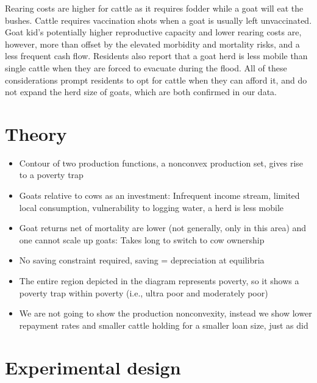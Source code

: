 	Rearing costs are higher for cattle as it requires fodder while a goat will eat the bushes. Cattle requires vaccination shots when a goat is usually left unvaccinated. Goat kid's potentially higher reproductive capacity and lower rearing costs are, however, more than offset by the elevated morbidity and mortality risks, and a less frequent cash flow. Residents also report that a goat herd is less mobile than single cattle when they are forced to evacuate during the flood. All of these considerations prompt residents to opt for cattle when they can afford it, and do not expand the herd size of goats, which are both confirmed in our data.


\section{Theory}
\label{SecTheory}

\hspace{-3em}\mpage{\linewidth}{}

\begin{itemize}
\vspace{1.0ex}\setlength{\itemsep}{1.0ex}\setlength{\baselineskip}{12pt}
\item	Contour of two production functions, a nonconvex production set, gives rise to a poverty trap
\item	Goats relative to cows as an investment: Infrequent income stream, limited local consumption, vulnerability to logging water, a herd is less mobile
\item	Goat returns net of mortality are lower (not generally, only in this area) and one cannot scale up goats: Takes long to switch to cow ownership
\item	No saving constraint required, saving = depreciation at equilibria
\item	The entire region depicted in the diagram represents poverty, so it shows a poverty trap within poverty (i.e., ultra poor and moderately poor)
\item	We are not going to show the production nonconvexity, instead we show lower repayment rates and smaller cattle holding for a smaller loan size, just as \citet{BandieraBRAC2017} did
\end{itemize}

\section{Experimental design}
\label{SecExperimentalDesign}


